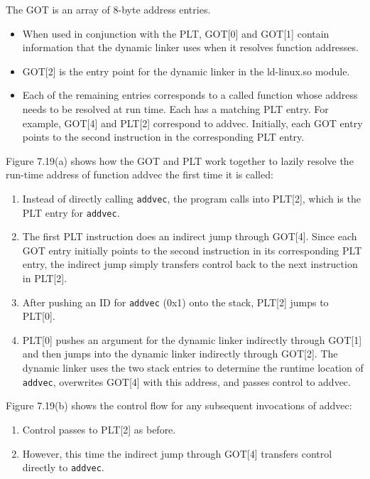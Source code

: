 \documentclass[11pt]{article}
\begin{document}
The GOT is an array of 8-byte address entries.\\
\begin{itemize}
\item When used in conjunction with the PLT, GOT[0] and GOT[1] contain information that the dynamic linker uses when it resolves function addresses.\\
\item GOT[2] is the entry point for the dynamic linker in the ld-linux.so module.\\
\item Each of the remaining entries corresponds to a called function whose address needs to be resolved at run time. Each has a matching PLT entry. For example, GOT[4] and PLT[2] correspond to addvec. Initially, each GOT entry points to the second instruction in the corresponding PLT entry.\\
\end{itemize}


Figure 7.19(a) shows how the GOT and PLT work together to lazily resolve the run-time address of function addvec the first time it is called:\\
\begin{enumerate}
\item Instead of directly calling \texttt{addvec}, the program calls into PLT[2], which is the PLT entry for \texttt{addvec}.\\
\item The first PLT instruction does an indirect jump through GOT[4]. Since each GOT entry initially points to the second instruction in its corresponding PLT entry, the indirect jump simply transfers control back to the next instruction in PLT[2].\\
\item After pushing an ID for \texttt{addvec} (0x1) onto the stack, PLT[2] jumps to PLT[0].\\
\item PLT[0] pushes an argument for the dynamic linker indirectly through GOT[1] and then jumps into the dynamic linker indirectly through GOT[2]. The dynamic linker uses the two stack entries to determine the runtime location of \texttt{addvec}, overwrites GOT[4] with this address, and passes control to addvec.\\
\end{enumerate}



Figure 7.19(b) shows the control flow for any subsequent invocations of addvec:\\
\begin{enumerate}
\item Control passes to PLT[2] as before.\\
\item However, this time the indirect jump through GOT[4] transfers control directly to \texttt{addvec}.\\
\end{enumerate}
\end{document}
